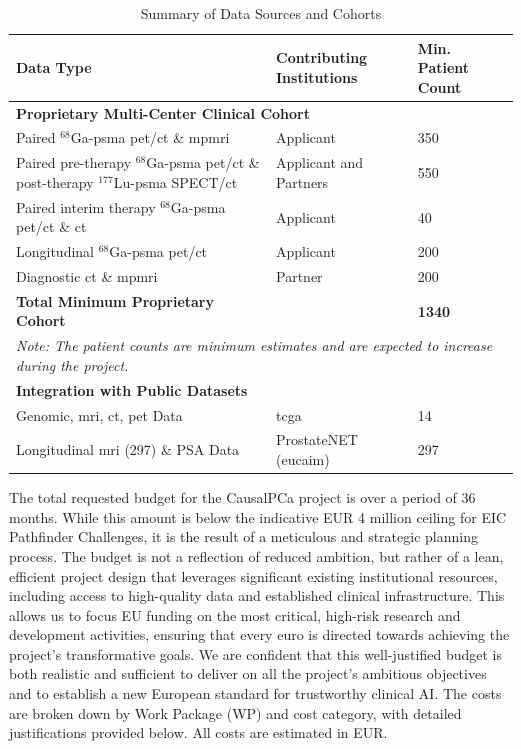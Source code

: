 \documentclass[11pt, a4paper]{article}
\begin{document}
\begin{table}[H]
\caption{Summary of Data Sources and Cohorts}
\label{tab:data}
\begin{tabular}{p{} p{} p{}}
\toprule
\textbf{Data Type} & \textbf{Contributing Institutions} & \textbf{Min. Patient Count} \\
\midrule
\multicolumn{3}{l}{\textbf{Proprietary Multi-Center Clinical Cohort}} \\
\midrule
Paired $^{68}$Ga-\gls{psma} \gls{pet}/\gls{ct} \& mp\gls{mri} & Applicant & 350 \\
\cmidrule(lr){1-3}
Paired pre-therapy $^{68}$Ga-\gls{psma} \gls{pet}/\gls{ct} \& post-therapy $^{177}$Lu-\gls{psma} SPECT/\gls{ct} & Applicant and Partners & 550 \\
\cmidrule(lr){1-3}
Paired interim therapy $^{68}$Ga-\gls{psma} \gls{pet}/\gls{ct} \& \gls{ct} & Applicant & 40 \\
\cmidrule(lr){1-3}
Longitudinal $^{68}$Ga-\gls{psma} \gls{pet}/\gls{ct} & Applicant & 200 \\
\cmidrule(lr){1-3}
Diagnostic \gls{ct} \& mp\gls{mri} & Partner & 200 \\
\midrule
\textbf{Total Minimum Proprietary Cohort} & & \textbf{1340} \\
\midrule
\multicolumn{3}{p{\dimexpr\linewidth-2\tabcolsep}}{\small\textit{Note: The patient counts are minimum estimates and are expected to increase during the project.}} \\
\midrule
\multicolumn{3}{l}{\textbf{Integration with Public Datasets}} \\
\midrule
Genomic, \gls{mri}, \gls{ct}, \gls{pet} Data & \gls{tcga} \cite{zuley2016cancer} & 14 \\
\cmidrule(lr){1-3}
Longitudinal \gls{mri} (297) \& PSA Data & ProstateNET (\gls{eucaim}) \cite{prostateNetArchive} & 297 \\
\bottomrule
\end{tabular}
\end{table}

The total requested budget for the CausalPCa project is \textbf{} over a period of 36 months. While this amount is below the indicative EUR 4 million ceiling for EIC Pathfinder Challenges, it is the result of a meticulous and strategic planning process. The budget is not a reflection of reduced ambition, but rather of a lean, efficient project design that leverages significant existing institutional resources, including access to high-quality data and established clinical infrastructure. This allows us to focus EU funding on the most critical, high-risk research and development activities, ensuring that every euro is directed towards achieving the project's transformative goals. We are confident that this well-justified budget is both realistic and sufficient to deliver on all the project's ambitious objectives and to establish a new European standard for trustworthy clinical AI. The costs are broken down by Work Package (WP) and cost category, with detailed justifications provided below. All costs are estimated in EUR.
\end{document}
